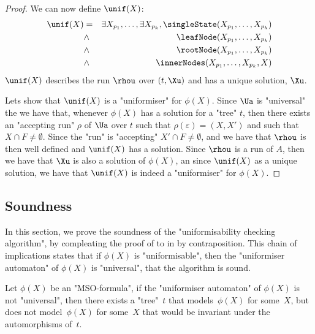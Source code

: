 \documentclass[a4paper,UKenglish,cleveref, autoref, thm-restate]{lipics-v2021}
\begin{document}
\begin{proof}
	We can now define $\unif(X)$:
	\begin{eqnarray*}
		\unif (X) &=& \exists X_{p_1}, \ldots, \exists X_{p_k}, \singleState (X_{p_1}, \ldots, X_{p_k}) \\
		&\land& \leafNode (X_{p_1}, \ldots, X_{p_k})\\
		&\land& \rootNode (X_{p_1}, \ldots, X_{p_k})\\
		&\land& \innerNodes (X_{p_1}, \ldots, X_{p_k}, X)
	\end{eqnarray*}
	$\unif(X)$ describes the run $\rhou$ over $(t,\Xu)$ and has a unique solution, $\Xu$.

	Lets show that $\unif(X)$ is a "uniformiser" for $\phi(X)$.
	Since $\Ua$ is "universal" the we have that, whenever $\phi(X)$ has a solution for a "tree" $t$, then there exists an "accepting run" $\rho$ of $\Ua$ over $t$
	such that $\rho(\varepsilon) = (X,X')$ and such that $X \cap F \neq \emptyset$. Since the "run" is "accepting" $X' \cap F \neq \emptyset$, and we have that
	$\rhou$ is then well defined and $\unif(X)$ has a solution. Since $\rhou$ is a run of $A$, then we have that $\Xu$ is also a solution of $\phi(X)$, an since
	$\unif(X)$ as a unique solution, we have that $\unif(X)$ is indeed a "uniformiser" for $\phi(X)$.

\end{proof}

\subsection{Soundness}\label{section:soundness}

In this section, we prove the soundness of the "uniformisability checking algorithm", by compleating the proof of  to
 in  by contraposition.
This chain of implications states that if $\phi(X)$ is "uniformisable", then the "uniformiser automaton" of $\phi(X)$ is "universal", \ie that the algorithm is sound.

\begin{lemma}\label{lemma:not-universal-implies-non-invariant}
	Let $\phi(X)$ be an "MSO-formula", if the "uniformiser automaton" of $\phi(X)$ is not  "universal",
	then there exists a "tree"~$t$ that models~$\phi(X)$ for some~$X$, but does not model~$\phi(X)$ for some~$X$
	that would be invariant under the automorphisms of~$t$.
\end{lemma}
\end{document}
